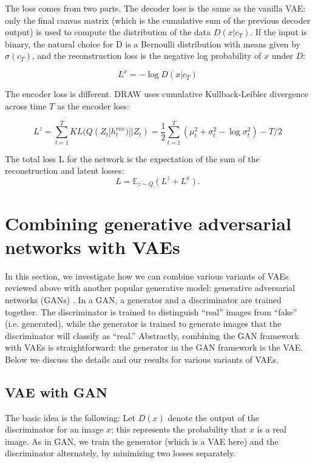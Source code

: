 \documentclass[10pt]{article}
\newcommand{\E}{\mathbb{E}}
\begin{document}
The loss comes from two parts. The decoder loss is the same as the vanilla VAE: only the final canvas matrix (which is the cumulative sum of the previous decoder output) is used to compute the distribution of the data $D(x|c_T)$. If the input is binary, the natural choice for D is a Bernoulli distribution with means given by $\sigma(c_T)$, and the reconstruction loss is the negative log probability of $x$ under $D$:

$$L^{x} = - \log D(x|c_T)$$

The encoder loss is different. DRAW uses cumulative Kullback-Leibler divergence across time $T$ as the encoder loss:

$$L^z = \sum_{t=1}^{T} KL(Q(Z_t|h_{t}^{enc})||Z_t) = \frac{1}{2}\sum_{t=1}^{T}(\mu_t^2 + \sigma_t^2 - \log \sigma^2_t) - T/2$$

The total loss L for the network is the expectation of the sum of the reconstruction and latent losses:
$$L = \E_{z \sim Q} (L^z + L^x).$$







\section{Combining generative adversarial networks with VAEs}

In this section, we investigate how we can combine various variants of VAEs reviewed above with another popular generative model: generative adversarial networks (GANs) \cite{goodfellow2014gan}. In a GAN, a generator and a discriminator are trained together.
The discriminator is trained to distinguish ``real'' images from ``fake'' (i.e. generated), while the generator is trained to generate images that the discriminator will classify as ``real.''
Abstractly, combining the GAN framework with VAEs is straightforward: the generator in the GAN framework is the VAE. Below we discuss the details and our results for various variants of VAEs.

\subsection{VAE with GAN}
The basic idea is the following: Let $D(x)$ denote the output of the discriminator for an image $x$; this represents the probability that $x$ is a real image. As in GAN, we train the generator (which is a VAE here) and the discriminator alternately, by minimizing two losses separately.
\end{document}
